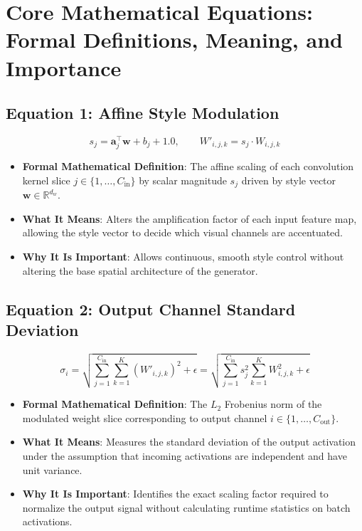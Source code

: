 \documentclass[11pt,a4paper]{article}
\theoremstyle{definition}
\begin{document}
\section{Core Mathematical Equations: Formal Definitions, Meaning, and Importance}

\subsection{\textbf{Equation 1: Affine Style Modulation}}
{\boldmath
\begin{equation}
s_j = \mathbf{a}_j^\top \mathbf{w} + b_j + 1.0, \qquad W'_{i, j, k} = s_j \cdot W_{i, j, k}
\end{equation}
}
\begin{itemize}
    \item \textbf{Formal Mathematical Definition}:
    The affine scaling of each convolution kernel slice $j \in \{1, \dots, C_{\text{in}}\}$ by scalar magnitude $s_j$ driven by style vector $\mathbf{w} \in \mathbb{R}^{d_w}$.
    \item \textbf{What It Means}:
    Alters the amplification factor of each input feature map, allowing the style vector to decide which visual channels are accentuated.
    \item \textbf{Why It Is Important}:
    Allows continuous, smooth style control without altering the base spatial architecture of the generator.
\end{itemize}

\subsection{\textbf{Equation 2: Output Channel Standard Deviation}}
{\boldmath
\begin{equation}
\sigma_i = \sqrt{\sum_{j=1}^{C_{\text{in}}} \sum_{k=1}^K (W'_{i, j, k})^2 + \epsilon} = \sqrt{\sum_{j=1}^{C_{\text{in}}} s_j^2 \sum_{k=1}^K W_{i, j, k}^2 + \epsilon}
\end{equation}
}
\begin{itemize}
    \item \textbf{Formal Mathematical Definition}:
    The $L_2$ Frobenius norm of the modulated weight slice corresponding to output channel $i \in \{1, \dots, C_{\text{out}}\}$.
    \item \textbf{What It Means}:
    Measures the standard deviation of the output activation under the assumption that incoming activations are independent and have unit variance.
    \item \textbf{Why It Is Important}:
    Identifies the exact scaling factor required to normalize the output signal without calculating runtime statistics on batch activations.
\end{itemize}
\end{document}
